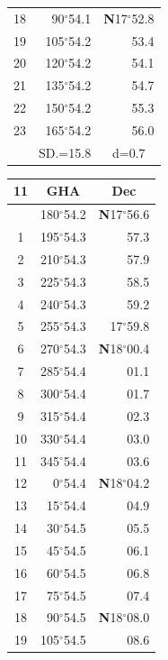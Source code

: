 \documentclass[10pt, a4paper]{report}
\begin{document}
\begin{scriptsize}
\begin{tabular*}{0.2\textwidth}[t]{@{\extracolsep{\fill}}|c|rr|}
18 & 90$^\circ$54.1 & \textbf{N}17$^\circ$52.8\\
19 & 105$^\circ$54.2 & 53.4\\
20 & 120$^\circ$54.2 & 54.1\\
21 & 135$^\circ$54.2 & \raisebox{0.24ex}{\boldmath$\cdot$~\boldmath$\cdot$~~}54.7\\
22 & 150$^\circ$54.2 & 55.3\\
23 & 165$^\circ$54.2 & 56.0\\
\hline
\rule{0pt}{2.4ex} & \multicolumn{1}{c}{SD.=15.8} & \multicolumn{1}{c|}{d=0.7}\\
\hline
\end{tabular*}\noindent
\begin{tabular*}{0.2\textwidth}[t]{@{\extracolsep{\fill}}|c|rr|}
\hline
\multicolumn{1}{|c|}{\rule{0pt}{2.6ex}\textbf{11}} & \multicolumn{1}{c}{\textbf{GHA}} & \multicolumn{1}{c|}{\textbf{Dec}}\\
\hline\rule{0pt}{2.6ex}\noindent
0 & 180$^\circ$54.2 & \textbf{N}17$^\circ$56.6\\
1 & 195$^\circ$54.3 & 57.3\\
2 & 210$^\circ$54.3 & 57.9\\
3 & 225$^\circ$54.3 & \raisebox{0.24ex}{\boldmath$\cdot$~\boldmath$\cdot$~~}58.5\\
4 & 240$^\circ$54.3 & 59.2\\
5 & 255$^\circ$54.3 & 17$^\circ$59.8\\[2Pt]
6 & 270$^\circ$54.3 & \textbf{N}18$^\circ$00.4\\
7 & 285$^\circ$54.4 & 01.1\\
8 & 300$^\circ$54.4 & 01.7\\
9 & 315$^\circ$54.4 & \raisebox{0.24ex}{\boldmath$\cdot$~\boldmath$\cdot$~~}02.3\\
10 & 330$^\circ$54.4 & 03.0\\
11 & 345$^\circ$54.4 & 03.6\\[2Pt]
12 & 0$^\circ$54.4 & \textbf{N}18$^\circ$04.2\\
13 & 15$^\circ$54.4 & 04.9\\
14 & 30$^\circ$54.5 & 05.5\\
15 & 45$^\circ$54.5 & \raisebox{0.24ex}{\boldmath$\cdot$~\boldmath$\cdot$~~}06.1\\
16 & 60$^\circ$54.5 & 06.8\\
17 & 75$^\circ$54.5 & 07.4\\[2Pt]
18 & 90$^\circ$54.5 & \textbf{N}18$^\circ$08.0\\
19 & 105$^\circ$54.5 & 08.6\\

\end{tabular*}
\end{scriptsize}
\end{document}
